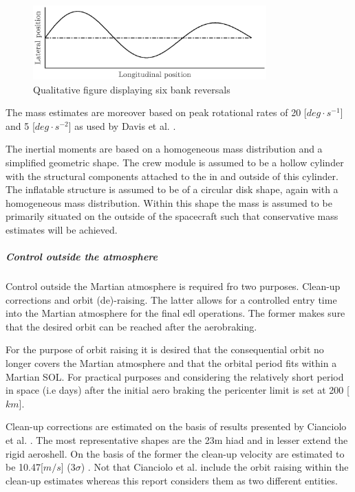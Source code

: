 \begin{figure}[h]
	\centering
	\includegraphics[width=0.8\textwidth]{./Figure/control/bankdef.eps}
	\caption{Qualitative figure displaying six bank reversals}
	\label{fig:bankdef}
\end{figure}


The mass estimates are moreover based on peak rotational rates of 20 [$deg\cdot s^{-1}$] and 5 [$deg \cdot s^{-2}$] as used by Davis et al. \cite{Davis2010}.

The inertial moments are based on a homogeneous mass distribution and a simplified geometric shape. The crew module is assumed to be a hollow cylinder with the structural components attached to the in and outside of this cylinder. The inflatable structure is assumed to be of a circular disk shape, again with a homogeneous mass distribution. Within this shape the mass is assumed to be primarily situated on the outside of the spacecraft such that conservative mass estimates will be achieved.


\subparagraph{Control outside the atmosphere}

Control outside the Martian atmosphere is required fro two purposes. Clean-up corrections and orbit (de)-raising. The latter allows for a controlled entry time into the Martian atmosphere for the final \gls{edl} operations. The former makes sure that the desired orbit can be reached after the aerobraking.

For the purpose of orbit raising it is desired that the consequential orbit no longer covers the Martian atmosphere and that the orbital period fits within a Martian SOL. For practical purposes and considering the relatively short period in space (i.e days) after the initial aero braking the pericenter limit is set at 200 [$km$]. 

Clean-up corrections are estimated on the basis of results presented by Cianciolo et al. \cite{Cianciolo2010}. The most representative shapes are the 23m \gls{hiad} and in lesser extend the rigid aeroshell. On the basis of the former the clean-up velocity are estimated to be 10.47[$m/s$] ($3\sigma$) \cite[p.37]{Cianciolo2010}. Not that Cianciolo et al. include the orbit raising within the clean-up estimates whereas this report considers them as two different entities.

